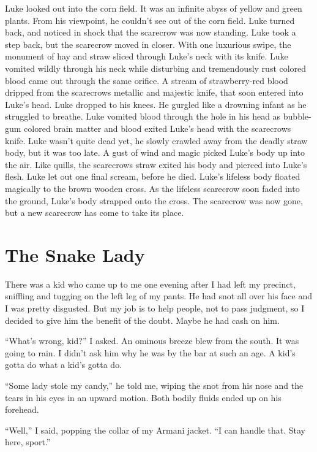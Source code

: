 Luke looked out into the corn field. It was an infinite abyss of
yellow and green plants. From his viewpoint, he couldn't see out of
the corn field. Luke turned back, and noticed in shock that the
scarecrow was now standing. Luke took a step back, but the
scarecrow moved in closer. With one luxurious swipe, the monument
of hay and straw sliced through Luke's neck with its knife. Luke
vomited wildly through his neck while disturbing and tremendously
rust colored blood came out through the same orifice. A stream of
strawberry-red blood dripped from the scarecrows metallic and
majestic knife, that soon entered into Luke's head. Luke dropped to
his knees. He gurgled like a drowning infant as he struggled to
breathe. Luke vomited blood through the hole in his head as
bubble-gum colored brain matter and blood exited Luke's head with
the scarecrows knife. Luke wasn't quite dead yet, he slowly crawled
away from the deadly straw body, but it was too late. A gust of
wind and magic picked Luke's body up into the air. Like quills, the
scarecrows straw exited his body and pierced into Luke's flesh.
Luke let out one final scream, before he died. Luke's lifeless body
floated magically to the brown wooden cross. As the lifeless
scarecrow soon faded into the ground, Luke's body strapped onto the
cross. The scarecrow was now gone, but a new scarecrow has come to
take its place. 
 



\chapter{The Snake Lady}


There was a kid who came up to me one evening after I had left my
precinct, sniffling and tugging on the left leg of my pants. He had
snot all over his face and I was pretty disgusted. But my job is to
help people, not to pass judgment, so I decided to give him the
benefit of the doubt. Maybe he had cash on him.

``What's wrong, kid?'' I asked. An ominous breeze
blew from the south. It was going to rain. I didn't ask him
why he was by the bar at such an age. A kid's gotta do what a
kid's gotta do.

``Some lady stole my candy,'' he told me, wiping the snot
from his nose and the tears in his eyes in an upward motion. Both
bodily fluids ended up on his forehead.

``Well,'' I said, popping the collar of my Armani jacket.
``I can handle that. Stay here, sport.''

